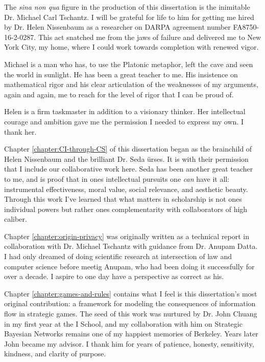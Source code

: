 \documentclass[../thesis.tex]{subfiles}
\begin{document}
 The \textit{sina non qua} figure in the production of this dissertation is the inimitable Dr. Michael Carl Tschantz.
 I will be grateful for life to him for getting me hired by Dr. Helen Nissenbaum as a researcher on DARPA agreement number FA8750-16-2-0287.
 This act snatched me from the jaws of failure and delivered me to New York City, my home, where I could work towards completion with renewed vigor.

 Michael is a man who has, to use the Platonic metaphor,
 left the cave and seen the world in sunlight.
 He has been a great teacher to me.
 His insistence on mathematical rigor and his clear
 articulation of the weaknesses of my arguments, again and again,
 me to reach for the level of rigor
 that I can be proud of.

 Helen is a firm taskmaster in addition to a visionary thinker.
 Her intellectual courage and ambition gave me the permission I needed to express my own.
 I thank her.
 
 Chapter \ref{chapter:CI-through-CS} of this dissertation began as the brainchild of Helen Nissenbaum and the brilliant Dr. Seda {\"u}rses.
 It is with their permission that I include our collaborative work here.
 Seda has been another great teacher to me,
 and is proof that in ones intellectual pursuits
 one \textit{can} have it all:
 instrumental effectiveness, moral value, social relevance,
 and aesthetic beauty.
 Through this work I've learned that what matters in
 scholarship is not ones individual powers but rather
 ones complementarity with collaborators of high caliber.

 Chapter \ref{chapter:origin-privacy} was originally written
 as a technical report in collaboration with Dr. Michael Tschantz
 with guidance from Dr. Anupam Datta.
 I had only dreamed of
 doing scientific research at intersection of law
 and computer science before meetig Anupam,
 who had been doing it successfully for over a decade.
 I aspire to one day have a perspective as correct as his.

 Chapter \ref{chapter:games-and-rules} contains what I feel
 is this dissertation's most original contribution:
 a framework for modeling the consequences of information flow
 in strategic games.
 The seed of this work was nurtured by Dr. John Chuang
 in my first year at the I School, and my collaboration
 with him on Strategic Bayesian Networks remains one of
 my happiest memories of Berkeley.
 Years later John became my advisor.
 I thank him for years of patience, honesty, sensitivity,
 kindness, and clarity of purpose.
\end{document}
